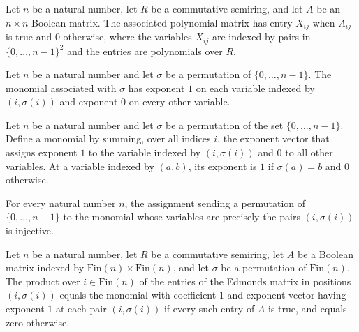 \begin{definition}
\label{Randomized.Matching.edmondsMatrix}
\leanok
Let $n$ be a natural number, let $R$ be a commutative semiring, and let $A$ be an
$n\times n$ Boolean matrix. The associated polynomial matrix has entry $X_{ij}$ when
$A_{ij}$ is true and $0$ otherwise, where the variables $X_{ij}$ are indexed by pairs in
$\{0,\ldots,n-1\}^2$ and the entries are polynomials over $R$.
\end{definition}

\begin{definition}
\label{Randomized.Matching.matchMono}
\leanok
Let $n$ be a natural number and let $\sigma$ be a permutation of $\{0,\ldots,n-1\}$. The
monomial associated with $\sigma$ has exponent $1$ on each variable indexed by
$(i,\sigma(i))$ and exponent $0$ on every other variable.
\end{definition}

\begin{theorem}
\label{Randomized.Matching.matchMono_apply}
\leanok
{}
Let $n$ be a natural number and let $\sigma$ be a permutation of the set
$\{0,\ldots,n-1\}$. Define a monomial by summing, over all indices $i$, the exponent
vector that assigns exponent $1$ to the variable indexed by $(i,\sigma(i))$ and $0$ to
all other variables. At a variable indexed by $(a,b)$, its exponent is $1$ if
$\sigma(a)=b$ and $0$ otherwise.
\end{theorem}

\begin{theorem}
\label{Randomized.Matching.matchMono_injective}
\leanok
{}
For every natural number $n$, the assignment sending a permutation of $\{0,\ldots,n-1\}$
to the monomial whose variables are precisely the pairs $(i,\sigma(i))$ is injective.
\end{theorem}

\begin{theorem}
\label{Randomized.Matching.prod_edmondsMatrix}
\leanok
{}
Let $n$ be a natural number, let $R$ be a commutative semiring, let $A$ be a Boolean
matrix indexed by $\text{Fin}(n)\times\text{Fin}(n)$, and let $\sigma$ be a permutation
of $\text{Fin}(n)$. The product over $i\in\text{Fin}(n)$ of the entries of the Edmonds
matrix in positions $(i,\sigma(i))$ equals the monomial with coefficient $1$ and
exponent vector having exponent $1$ at each pair $(i,\sigma(i))$ if every such entry of
$A$ is true, and equals zero otherwise.
\end{theorem}

